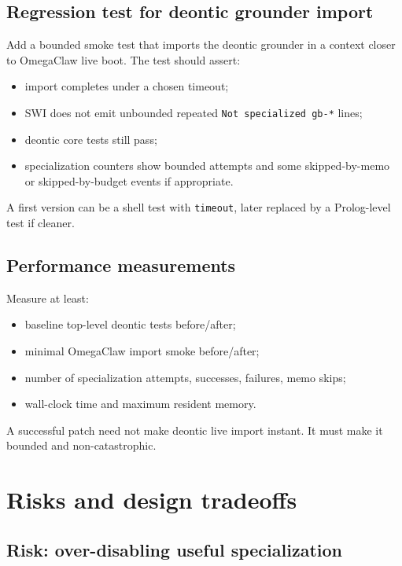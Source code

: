\documentclass[11pt]{article}
\begin{document}
\subsection{Regression test for deontic grounder import}

Add a bounded smoke test that imports the deontic grounder in a context closer to OmegaClaw live boot. The test should assert:

\begin{itemize}[nosep]
\item import completes under a chosen timeout;
\item SWI does not emit unbounded repeated \texttt{Not specialized gb-*} lines;
\item deontic core tests still pass;
\item specialization counters show bounded attempts and some skipped-by-memo or skipped-by-budget events if appropriate.
\end{itemize}

A first version can be a shell test with \texttt{timeout}, later replaced by a Prolog-level test if cleaner.

\subsection{Performance measurements}

Measure at least:

\begin{itemize}[nosep]
\item baseline top-level deontic tests before/after;
\item minimal OmegaClaw import smoke before/after;
\item number of specialization attempts, successes, failures, memo skips;
\item wall-clock time and maximum resident memory.
\end{itemize}

A successful patch need not make deontic live import instant. It must make it bounded and non-catastrophic.

\section{Risks and design tradeoffs}

\subsection{Risk: over-disabling useful specialization}
\end{document}
